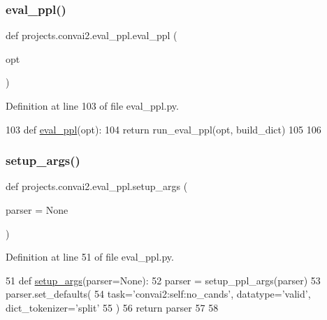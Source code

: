 \subsubsection{\texorpdfstring{eval\+\_\+ppl()}{eval\_ppl()}}
{\footnotesize\ttfamily def projects.\+convai2.\+eval\+\_\+ppl.\+eval\+\_\+ppl (\begin{DoxyParamCaption}\item[{}]{opt }\end{DoxyParamCaption})}



Definition at line 103 of file eval\+\_\+ppl.\+py.


\begin{DoxyCode}
103 \textcolor{keyword}{def }\hyperlink{namespaceprojects_1_1convai2_1_1eval__ppl_a417da48148c825ed1f5d6897cef06819}{eval\_ppl}(opt):
104     \textcolor{keywordflow}{return} run\_eval\_ppl(opt, build\_dict)
105 
106 
\end{DoxyCode}
\mbox{\label{namespaceprojects_1_1convai2_1_1eval__ppl_ac83f1cd52a81f455fc2e726d76e1100e}} 
\subsubsection{\texorpdfstring{setup\+\_\+args()}{setup\_args()}}
{\footnotesize\ttfamily def projects.\+convai2.\+eval\+\_\+ppl.\+setup\+\_\+args (\begin{DoxyParamCaption}\item[{}]{parser = {\ttfamily None} }\end{DoxyParamCaption})}



Definition at line 51 of file eval\+\_\+ppl.\+py.


\begin{DoxyCode}
51 \textcolor{keyword}{def }\hyperlink{namespaceprojects_1_1convai2_1_1eval__ppl_ac83f1cd52a81f455fc2e726d76e1100e}{setup\_args}(parser=None):
52     parser = setup\_ppl\_args(parser)
53     parser.set\_defaults(
54         task=\textcolor{stringliteral}{'convai2:self:no\_cands'}, datatype=\textcolor{stringliteral}{'valid'}, dict\_tokenizer=\textcolor{stringliteral}{'split'}
55     )
56     \textcolor{keywordflow}{return} parser
57 
58 
\end{DoxyCode}


